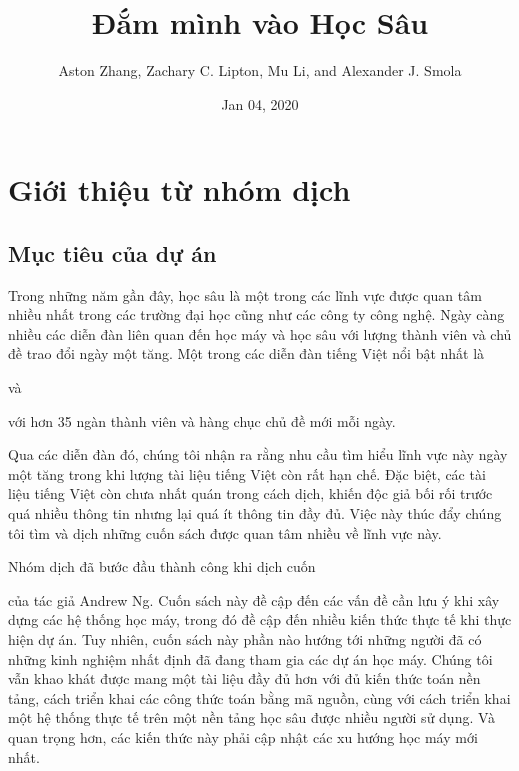 \documentclass[letterpaper,11pt,english]{sphinxmanual}
\title{Đắm mình vào Học Sâu}
\date{Jan 04, 2020}
\author{Aston Zhang, Zachary C. Lipton, Mu Li, and Alexander J. Smola}
\begin{document}
\pagestyle{empty}
\sphinxmaketitle
\pagestyle{plain}
\sphinxtableofcontents
\pagestyle{normal}
\label{\detokenize{index::doc}}



\chapter{Giới thiệu từ nhóm dịch}
\label{\detokenize{intro_vn:gioi-thieu-tu-nhom-dich}}\label{\detokenize{intro_vn::doc}}

\section{Mục tiêu của dự án}
\label{\detokenize{intro_vn:muc-tieu-cua-du-an}}
Trong những năm gần đây, học sâu là một trong các lĩnh vực được quan tâm
nhiều nhất trong các trường đại học cũng như các công ty công nghệ. Ngày
càng nhiều các diễn đàn liên quan đến học máy và học sâu với lượng thành
viên và chủ đề trao đổi ngày một tăng. Một trong các diễn đàn tiếng Việt
nổi bật nhất là %
\begin{footnote}[1]\sphinxAtStartFootnote
{}
%
\end{footnote} và %
\begin{footnote}[2]\sphinxAtStartFootnote
{}
%
\end{footnote}
với hơn 35 ngàn thành viên và hàng chục chủ đề mới mỗi ngày.

Qua các diễn đàn đó, chúng tôi nhận ra rằng nhu cầu tìm hiểu lĩnh vực
này ngày một tăng trong khi lượng tài liệu tiếng Việt còn rất hạn chế.
Đặc biệt, các tài liệu tiếng Việt còn chưa nhất quán trong cách dịch,
khiến độc giả bối rối trước quá nhiều thông tin nhưng lại quá ít thông
tin đầy đủ. Việc này thúc đẩy chúng tôi tìm và dịch những cuốn sách được
quan tâm nhiều về lĩnh vực này.

Nhóm dịch đã bước đầu thành công khi dịch cuốn %
\begin{footnote}[3]\sphinxAtStartFootnote
{}
%
\end{footnote}
của tác giả Andrew Ng. Cuốn sách này đề cập đến các vấn đề cần lưu ý khi
xây dựng các hệ thống học máy, trong đó đề cập đến nhiều kiến thức thực
tế khi thực hiện dự án. Tuy nhiên, cuốn sách này phần nào hướng tới
những người đã có những kinh nghiệm nhất định đã đang tham gia các dự án
học máy. Chúng tôi vẫn khao khát được mang một tài liệu đầy đủ hơn với
đủ kiến thức toán nền tảng, cách triển khai các công thức toán bằng mã
nguồn, cùng với cách triển khai một hệ thống thực tế trên một nền tảng
học sâu được nhiều người sử dụng. Và quan trọng hơn, các kiến thức này
phải cập nhật các xu hướng học máy mới nhất.
\end{document}
